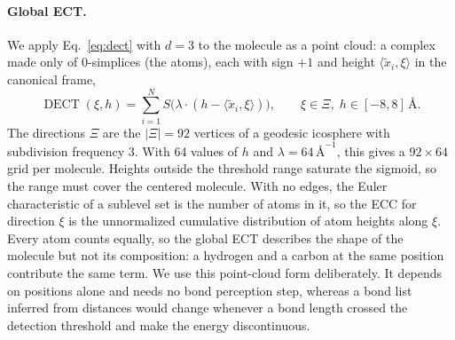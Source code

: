\documentclass{article}
\newcommand{\DECT}{\operatorname{DECT}}
\begin{document}
\paragraph{Global ECT.}
We apply Eq.~\eqref{eq:dect} with $d=3$ to the molecule as a point cloud: a complex made only of 0-simplices (the atoms), each with sign $+1$ and height $\langle\tilde x_i,\xi\rangle$ in the canonical frame,
\begin{equation}
  \DECT(\xi,h) = \sum_{i=1}^N S\big(\lambda\cdot(h - \langle\tilde x_i,\xi\rangle)\big), \qquad \xi\in\Xi,\; h\in[-8,8]\,\text{\AA}.
  \label{eq:global-ect}
\end{equation}
The directions $\Xi$ are the $|\Xi| = 92$ vertices of a geodesic icosphere with subdivision frequency 3. With 64 values of $h$ and $\lambda = 64\,\text{\AA}^{-1}$, this gives a $92\times 64$ grid per molecule.
Heights outside the threshold range saturate the sigmoid, so the range must cover the centered molecule. With no edges, the Euler characteristic of a sublevel set is the number of atoms in it, so the ECC for direction $\xi$ is the unnormalized cumulative distribution of atom heights along $\xi$. Every atom counts equally, so the global ECT describes the shape of the molecule but not its composition: a hydrogen and a carbon at the same position contribute the same term. We use this point-cloud form deliberately. It depends on positions alone and needs no bond perception step, whereas a bond list inferred from distances would change whenever a bond length crossed the detection threshold and make the energy discontinuous.
\end{document}
